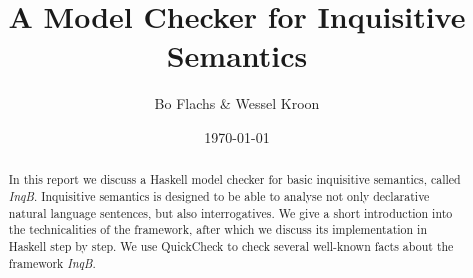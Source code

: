 \documentclass[12pt,a4paper]{article}
\title{A Model Checker for Inquisitive Semantics}
\author{Bo Flachs \& Wessel Kroon}
\date{\today}
\begin{document}
\maketitle

\begin{abstract}
In this report we discuss a Haskell model checker for basic inquisitive semantics, called \textit{InqB}. Inquisitive semantics is designed to be able to analyse not only declarative natural language sentences, but also interrogatives. We give a short introduction into the technicalities of the framework, after which we discuss its implementation in Haskell step by step. We use QuickCheck to check several well-known facts about the framework \textit{InqB}.
\end{abstract}

\tableofcontents

\clearpage

























\end{document}
